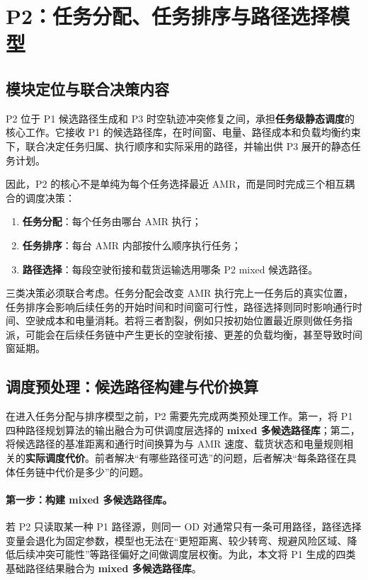﻿\section{P2：任务分配、任务排序与路径选择模型}

\subsection{模块定位与联合决策内容}

P2 位于 P1 候选路径生成和 P3 时空轨迹冲突修复之间，承担\textbf{任务级静态调度}的核心工作。它接收 P1 的候选路径库，在时间窗、电量、路径成本和负载均衡约束下，联合决定任务归属、执行顺序和实际采用的路径，并输出供 P3 展开的静态任务计划。


因此，P2 的核心不是单纯为每个任务选择最近 AMR，而是同时完成三个相互耦合的调度决策：

\begin{enumerate}
  \item \textbf{任务分配}：每个任务由哪台 AMR 执行；
  \item \textbf{任务排序}：每台 AMR 内部按什么顺序执行任务；
  \item \textbf{路径选择}：每段空驶衔接和载货运输选用哪条 P2 mixed 候选路径。
\end{enumerate}

三类决策必须联合考虑。任务分配会改变 AMR 执行完上一任务后的真实位置，任务排序会影响后续任务的开始时间和时间窗可行性，路径选择则同时影响通行时间、空驶成本和电量消耗。若将三者割裂，例如只按初始位置最近原则做任务指派，可能会在后续任务链中产生更长的空驶衔接、更差的负载均衡，甚至导致时间窗延期。

\subsection{调度预处理：候选路径构建与代价换算}

在进入任务分配与排序模型之前，P2 需要先完成两类预处理工作。第一，将 P1 四种路径规划算法的输出融合为可供调度层选择的 \textbf{mixed 多候选路径库}；第二，将候选路径的基准距离和通行时间换算为与 AMR 速度、载货状态和电量规则相关的\textbf{实际调度代价}。前者解决“有哪些路径可选”的问题，后者解决“每条路径在具体任务链中代价是多少”的问题。

\paragraph{第一步：构建 mixed 多候选路径库。}

若 P2 只读取某一种 P1 路径源，则同一 OD 对通常只有一条可用路径，路径选择变量会退化为固定参数，模型也无法在“更短距离、较少转弯、规避风险区域、降低后续冲突可能性”等路径偏好之间做调度层权衡。为此，本文将 P1 生成的四类基础路径结果融合为 \textbf{mixed 多候选路径库}。


